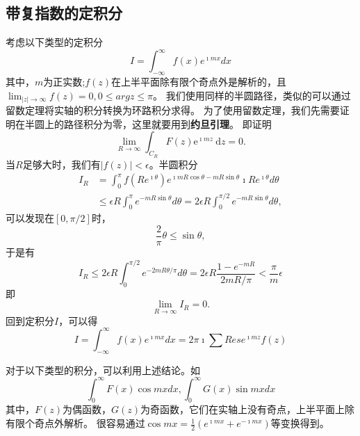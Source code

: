  \subsection{带复指数的定积分}
 考虑以下类型的定积分
 \begin{equation}
    I=\int_{-\infty}^{\infty} f(x) e^{\imath m x} d x
\end{equation}
其中，$m$为正实数;$f(z)$在上半平面除有限个奇点外是解析的，且$\lim_{|z|\to \infty} f(z) = 0, 0 \leq arg z \leq \pi$。
我们使用同样的半圆路径，类似的可以通过留数定理将实轴的积分转换为环路积分求得。
为了使用留数定理，我们先需要证明在半圆上的路径积分为零，这里就要用到\textbf{约旦引理}。
即证明
\begin{equation}
    \lim _{R \rightarrow \infty} \int_{C_R} F(z) \mathrm{e}^{\imath m z} \mathrm{~d} z=0 .
\end{equation}
当$R$足够大时，我们有$|f(z)| < \epsilon$。半圆积分
\begin{align}
    I_R&=\int_0^\pi f\left(R e^{\imath \theta}\right) 
    e^{\imath m R \cos \theta- m R \sin \theta} \imath R e^{\imath \theta} d \theta
    \\
    &\leq \epsilon R \int_0^\pi e^{-m R \sin \theta} d \theta=2 \epsilon R \int_0^{\pi / 2} e^{-m R \sin \theta} d \theta,
\end{align}
可以发现在$\left[ 0, \pi/2\right]$时，
\begin{equation}
    \frac{2}{\pi}\theta \leq \sin{\theta},
\end{equation}
于是有
\begin{equation}
    I_R \leq 2 \epsilon R \int_0^{\pi / 2} e^{-2 m R \theta / \pi} d \theta=2 \epsilon R \frac{1-e^{-m R}}{2 m R / \pi}<\frac{\pi}{m} \epsilon
\end{equation}
即
\begin{equation}
    \lim_{R\to \infty} I_R = 0.
\end{equation}
回到定积分$I$，可以得
\begin{equation}
    I=\int_{-\infty}^{\infty} f(x) e^{ \imath m x} d x = 2\pi \imath \sum Res e^{\imath m z} f(z)
\end{equation}

对于以下类型的积分，可以利用上述结论。如
\begin{equation}
    \int_{0}^{\infty} F(x) \cos {m x} dx, \int_{0}^{\infty} G(x) \sin{m x} dx
\end{equation}
其中，$F(z)$为偶函数，$G(z)$为奇函数，它们在实轴上没有奇点，上半平面上除有限个奇点外解析。
很容易通过$\cos{mx} = \frac{1}{2}\left( e^{\imath m x} + e^{-\imath mx}\right)$等变换得到。